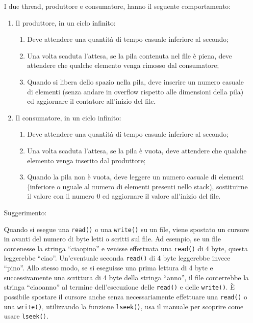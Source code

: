 \documentclass{article}
\numberwithin{equation}{subsection}
\begin{document}
I due thread, produttore e consumatore, hanno il seguente comportamento:
\begin{enumerate}
    \item Il produttore, in un ciclo infinito:
    \begin{enumerate}
        \item Deve attendere una quantità di tempo casuale inferiore al secondo;
        \item Una volta scaduta l'attesa, se la pila contenuta nel file è piena, deve attendere che qualche elemento venga rimosso dal consumatore;
        \item Quando si libera dello spazio nella pila, deve inserire un numero casuale di elementi (senza andare in overflow rispetto alle dimensioni della pila) ed aggiornare il contatore all'inizio del file.
    \end{enumerate}
    \item Il consumatore, in un ciclo infinito:
    \begin{enumerate}
        \item Deve attendere una quantità di tempo casuale inferiore al secondo;
        \item Una volta scaduta l'attesa, se la pila è vuota, deve attendere che qualche elemento venga inserito dal produttore;
        \item Quando la pila non è vuota, deve leggere un numero casuale di elementi (inferiore o uguale al numero di elementi presenti nello stack), sostituirne il valore con il numero 0 ed aggiornare il valore all'inizio del file.
    \end{enumerate}
\end{enumerate}

Suggerimento:

Quando si esegue una \verb|read()| o una \verb|write()| su un file, viene spostato un cursore in avanti del numero di byte letti o scritti sul file. Ad esempio, se un file contenesse la stringa ``ciaopino'' e venisse effettuata una \verb|read()| di 4 byte, questa leggerebbe ``ciao''. Un'eventuale seconda \verb|read()| di 4 byte leggerebbe invece ``pino''. Allo stesso modo, se si eseguisse una prima lettura di 4 byte e successivamente una scrittura di 4 byte della stringa ``anno'', il file conterrebbe la stringa ``ciaoanno'' al termine dell'esecuzione delle \verb|read()| e delle \verb|write()|.
\`{E} possibile spostare il cursore anche senza necessariamente effettuare una \verb|read()| o una \verb|write()|, utilizzando la funzione \verb|lseek()|, usa il manuale per scoprire come usare \verb|lseek()|.
\end{document}
